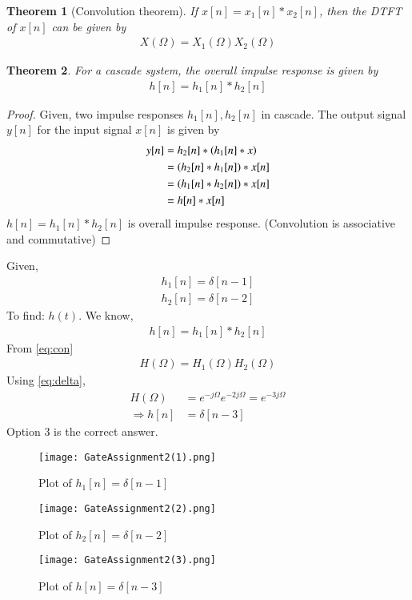 \documentclass[journal,12pt,twocolumn]{IEEEtran}
\newtheorem{theorem}{Theorem}[section]
\begin{document}
\begin{theorem}[Convolution theorem]If $x[n]=x_1[n]*x_2[n]$, then the DTFT of $x[n]$ can be given by
\begin{align}
    X(\Omega)=X_1(\Omega)X_2(\Omega)\label{eq:con}
\end{align}
\end{theorem}
\begin{theorem}For a cascade system, the overall impulse response is given by
\begin{align}
    h[n]=h_1[n]*h_2[n]\label{eq:oimp}
\end{align}
\end{theorem}
\begin{proof}
Given, two impulse responses $h_1[n],h_2[n]$ in cascade. The output signal $y[n]$ for the input signal $x[n]$ is given by
\begin{align}
    y[n]&=h_2[n]*\left(h_1[n]*x\right)\\
    &=\left(h_2[n]*h_1[n]\right)*x[n]\\
    &=\left(h_1[n]*h_2[n]\right)*x[n]\\
    &=h[n]*x[n]
\end{align}
$h[n]=h_1[n]*h_2[n]$ is overall impulse response. (Convolution is associative and commutative)
\end{proof}
Given,
\begin{align}
    h_1[n]=\delta[n-1]\\
    h_2[n]=\delta[n-2]
\end{align}
To find: $h(t)$. We know, 
\begin{align}
h[n]=h_1[n]*h_2[n]
\end{align}
From \eqref{eq:con}
\begin{align}
H(\Omega)=H_1(\Omega)H_2(\Omega)
\end{align}
Using \eqref{eq:delta}, 
\begin{align}
H(\Omega)&=e^{-j\Omega}e^{-2j\Omega}=e^{-3j\Omega}\\
\Rightarrow h[n]&=\delta[n-3]
\end{align}
Option 3 is the correct answer.
\begin{figure}[!h]
 \centering
 \texttt{[image: GateAssignment2(1).png]}
 \caption{Plot of $h_1[n]=\delta[n-1]$}
 \label{plot}
\end{figure}
\begin{figure}[!h]
 \centering
 \texttt{[image: GateAssignment2(2).png]}
 \caption{Plot of $h_2[n]=\delta[n-2]$}
 \label{plot}
\end{figure}
\begin{figure}[!h]
 \centering
 \texttt{[image: GateAssignment2(3).png]}
 \caption{Plot of $h[n]=\delta[n-3]$}
 \label{plot}
\end{figure}
\end{document}
